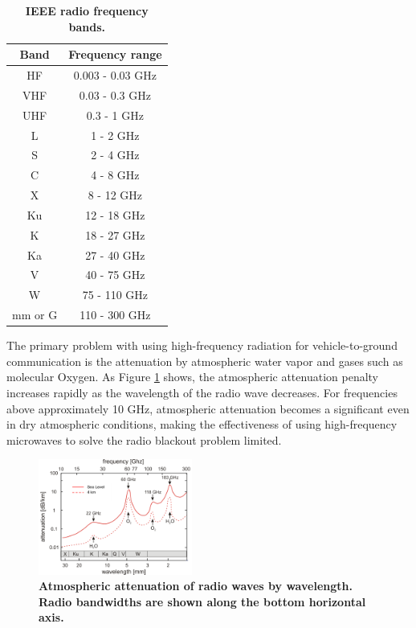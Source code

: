 \documentclass[twocolumn]{article}
\begin{document}
	\begin{table}[H]	
		\centering
		\begin{tabular}{c|c}
			Band    & Frequency range   \\ \hline
			HF      & 0.003 - 0.03 GHz \\
			VHF     & 0.03 - 0.3 GHz   \\
			UHF     & 0.3 - 1 GHz      \\
			L       & 1 - 2 GHz        \\
			S       & 2 - 4 GHz        \\
			C       & 4 - 8 GHz        \\
			X       & 8 - 12 GHz       \\
			Ku      & 12 - 18 GHz      \\
			K       & 18 - 27 GHz      \\
			Ka      & 27 - 40 GHz      \\
			V       & 40 - 75 GHz      \\
			W       & 75 - 110 GHz     \\
			mm or G & 110 - 300 GHz​  
		\end{tabular}
		\caption{\textbf{IEEE radio frequency bands.}}
		\label{tab:RadioBands}
	\end{table}
	
	The primary problem with using high-frequency radiation for vehicle-to-ground communication is the attenuation by atmospheric water vapor and gases such as molecular Oxygen.
	As Figure \ref{fig:RadioAttenuation} shows, the atmospheric attenuation penalty increases rapidly as the wavelength of the radio wave decreases.
	For frequencies above approximately 10 GHz, atmospheric attenuation becomes a significant even in dry atmospheric conditions, making the effectiveness of using high-frequency microwaves to solve the radio blackout problem limited.\cite{hartunian_implications_2007}
	
	\begin{figure}[H]
		\centering
		\includegraphics[width=0.45\textwidth]{Images/intro-atmospheric.png}
	\caption{\textbf{Atmospheric attenuation of radio waves by wavelength. Radio bandwidths are shown along the bottom horizontal axis.\cite{altshuler_comparison_1988}}}
	\label{fig:RadioAttenuation}
	\end{figure}
	
\end{document}
